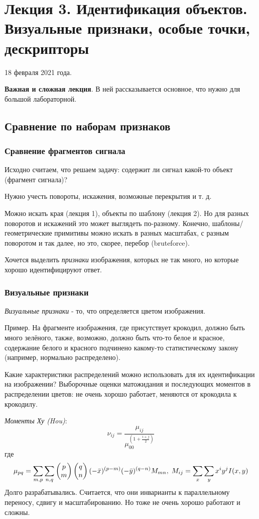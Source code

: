 \documentclass[main.tex]{subfiles}
\begin{document}
	
\section{Лекция 3. Идентификация объектов. Визуальные признаки, особые точки, дескрипторы}

18 февраля 2021 года.

\textbf{Важная и сложная лекция}.
В ней рассказывается основное, что нужно для большой лабораторной.
\subsection{Сравнение по наборам признаков}
\subsubsection{Сравнение фрагментов сигнала}

Исходно считаем, что решаем задачу: содержит ли сигнал какой-то объект (фрагмент сигнала)?

Нужно учесть повороты, искажения, возможные перекрытия и т. д.

Можно искать края (лекция 1), объекты по шаблону (лекция 2).
Но для разных поворотов и искажений это может выглядеть по-разному.
Конечно, шаблоны/геометрические примитивы можно искать в разных масштабах, с разным поворотом и так далее, но это, скорее, перебор (bruteforce).

Хочется выделить \emph{признаки} изображения, которых не так много, но которые хорошо идентифицируют ответ.

\subsubsection{Визуальные признаки}

\emph{Визуальные признаки} - то, что определяется цветом изображения.

Пример.
На фрагменте изображения, где присутствует крокодил, должно быть много зелёного, также, возможно, должно быть что-то белое и красное, содержание белого и красного подчинено какому-то статистическому закону (например, нормально распределено).

Какие характеристики распределений можно использовать для их идентификации на изображении?
Выборочные оценки матожидания и последующих моментов в распределении цветов: не очень хорошо работает, меняются от крокодила к крокодилу.

\emph{Моменты Ху (Hou)}:
$$ \nu_{ij} = \frac{\mu_{ij}}{\mu_{00}^{\left(1 + \frac{i+j}{2}\right)}} $$
где 
$$\mu_{pq} = \sum_{m, p} \sum_{n, q} 
\begin{pmatrix} p \\ m \end{pmatrix}
\begin{pmatrix} q \\ n \end{pmatrix}
(-\bar x)^{(p-m)}(-\bar y)^{(q-n)} M_{mn}, \thickspace
M_{ij} = \sum_x\sum_y x^i y^j I(x,y) $$
Долго разрабатывались.
Считается, что они инварианты к параллельному переносу, сдвигу и масштабированию.
Но тоже не очень хорошо работают и сложны.
\end{document}
